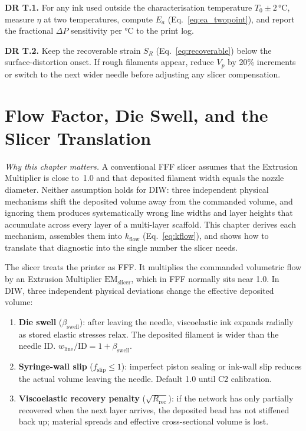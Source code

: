 \documentclass[11pt,a4paper]{article}
\begin{document}
\begin{designrulebox}
\textbf{DR T.1.} For any ink used outside the characterisation temperature
$T_0\pm2\,\si{\celsius}$, measure $\eta$ at two temperatures, compute
$E_a$ (Eq.~\ref{eq:ea_twopoint}), and report the fractional $\Delta P$
sensitivity per \si{\celsius} to the print log.

\textbf{DR T.2.} Keep the recoverable strain $S_R$ (Eq.~\ref{eq:recoverable})
below the surface-distortion onset. If rough filaments appear, reduce
$V_p$ by 20\% increments or switch to the next wider needle before
adjusting any slicer compensation.
\end{designrulebox}

\section{Flow Factor, Die Swell, and the Slicer Translation}
\label{sec:flow_factor}

\emph{Why this chapter matters.}
A conventional FFF slicer assumes that the Extrusion Multiplier is
close to~1.0 and that deposited filament width equals the nozzle
diameter. Neither assumption holds for DIW: three independent physical
mechanisms shift the deposited volume away from the commanded volume,
and ignoring them produces systematically wrong line widths and
layer heights that accumulate across every layer of a multi-layer
scaffold. This chapter derives each mechanism, assembles them into
$k_\mathrm{flow}$ (Eq.~\ref{eq:kflow}), and shows how to translate
that diagnostic into the single number the slicer needs.

The slicer treats the printer as FFF. It multiplies the commanded
volumetric flow by an Extrusion Multiplier $\mathrm{EM}_\mathrm{slicer}$,
which in FFF normally sits near 1.0. In DIW, three independent physical
deviations change the effective deposited volume:

\begin{enumerate}[leftmargin=1.6em,itemsep=2pt]
\item \textbf{Die swell} ($\beta_\mathrm{swell}$): after leaving the
needle, viscoelastic ink expands radially as stored elastic stresses
relax. The deposited filament is wider than the needle ID.
$w_\mathrm{line}/\mathrm{ID}=1+\beta_\mathrm{swell}$.
\item \textbf{Syringe-wall slip} ($f_\mathrm{slip}\leq 1$): imperfect
piston sealing or ink-wall slip reduces the actual volume leaving the
needle. Default 1.0 until C2 calibration.
\item \textbf{Viscoelastic recovery penalty} ($\sqrt{R_\mathrm{rec}}$):
if the network has only partially recovered when the next layer arrives,
the deposited bead has not stiffened back up; material spreads and
effective cross-sectional volume is lost.
\end{enumerate}
\end{document}
